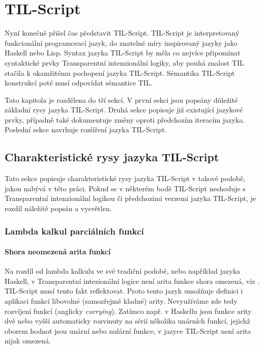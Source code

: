 \chapter{TIL-Script}\label{tilscript-chapter}

Nyní konečně přišel čas představit TIL-Script. TIL-Script je interpretovaný funkcionální
programovací jazyk, do znatelné míry inspirovaný jazyky jako Haskell nebo Lisp. Syntax jazyka
TIL-Script by měla co nejvíce připomínat syntaktické prvky Transparentní intenzionální logiky, aby
pouhá znalost TIL stačila k okamžitému pochopení jazyka TIL-Script. Sémantika TIL-Script konstrukcí
poté musí odpovídat sémantice TIL.

Tato kapitola je rozdělena do tří sekcí. V první sekci jsou popsány důležité základní rysy jazyka
TIL-Script. Druhá sekce popisuje již existující jazykové prvky, případně také dokumentuje změny
oproti předchozím iteracím jazyka. Poslední sekce navrhuje rozšíření jazyka TIL-Script.

\section{Charakteristické rysy jazyka TIL-Script}

Tato sekce popisuje charakteristické rysy jazyka TIL-Script v takové podobě, jakou nabývá v této
práci. Pokud se v některém bodě TIL-Script neshoduje s Transparentní intenzionální logikou či
předchozími verzemi jazyka TIL-Script, je rozdíl náležitě popsán a vysvětlen.

\subsection{Lambda kalkul parciálních funkcí}

\subsubsection{Shora neomezená arita funkcí}

Na rozdíl od lambda kalkulu ve své tradiční podobě, nebo například jazyka Haskell, v Transparentní
intezionální logice není arita funkce shora omezená, viz . TIL-Script musí tento
fakt reflektovat. Proto tento jazyk umožňuje definici i aplikaci funkcí libovolné (samozřejmě
kladné) arity. Nevyužíváme zde tedy rozvíjení funkcí (anglicky \textit{currying})\cite{partiality}.
Zatímco např. v Haskellu jsou funkce arity dvě nebo vyšší automaticky rozvinuty na sérií několika
unárních funkcí, jejichž oborem hodnot jsou unární nebo nulární funkce, v jazyce TIL-Script není
arita nijak omezená.

